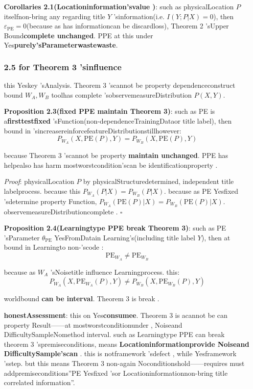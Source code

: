 \documentclass[
  12pt,
]{article}
\begin{document}
\textbf{Corollaries 2.1(Locationinformation'svalue )}: such as physicalLocation \(P\)
itselfnon-bring any regarding title  \(Y\) 'sinformation(i.e. \(I(Y; P | X) = 0\)), then 
\(\varepsilon_{\text{PE}} = 0\)(because as has informationcan be discardloss), Theorem 2
'sUpper Bound\textbf{complete unchanged}. PPE at this under Yes\textbf{purely'sParameterwastewaste}. 

\subsubsection{2.5 for  Theorem 3
'sinfluence }\label{ux5bf9-theorem-3-ux7684ux5f71ux54cd}

this Yeskey 'sAnalysis. Theorem 3 'scannot be property dependenceconstruct bound  \(W_A, W_B\)
toolhas complete 'sobservemeasureDistribution \(P(X, Y)\). 

\textbf{Proposition 2.3(fixed  PPE maintain  Theorem 3)}: such as  PE
is a\textbf{firsttestfixed }'sFunction(non-dependenceTrainingDataor title label), then bound in 'sincreasereinforcefeatureDistributionstillhowever: 
\[P_{W_A}(X, \text{PE}(P), Y) = P_{W_B}(X, \text{PE}(P), Y)\]

because  Theorem 3 'scannot be property \textbf{maintain unchanged}. PPE
has helpealso has harm mostworstcondition'scan be identificationproperty . 

\emph{Proof}: physicalLocation \(P\) by physicalStructuredetermined, independent title labelprocess. because this
\(P_{W_A}(P|X) = P_{W_B}(P|X)\). because as  PE
Yesfixed 'sdetermine property Function, \(P_{W_A}(\text{PE}(P)|X) = P_{W_B}(\text{PE}(P)|X)\). observemeasureDistributioncomplete . \(\square\)

\textbf{Proposition 2.4(Learningtype  PPE break  Theorem 3)}: such as  PE 'sParameter
\(\theta_{\text{PE}}\) YesFromDatain Learning's(including title label
\(Y\)), then at bound in Learningto non-'scode : 
\[\text{PE}_{W_A} \neq \text{PE}_{W_B}\]

because as  \(W_A\) 'sNoisetitle influence Learningprocess. this: 
\[P_{W_A}(X, \text{PE}_{W_A}(P), Y) \neq P_{W_B}(X, \text{PE}_{W_B}(P), Y)\]

worldbound \textbf{can be interval}. Theorem 3 is break . 

\textbf{honestAssessment}: this on Yes\textbf{consumee}. Theorem 3
is acannot be can property Result------at mostworstconditionunder , Noiseand DifficultySampleNomethod interval. such as Learningtype 
PPE can break theorem  3
'spremiseconditions, means \textbf{Locationinformationprovide Noiseand DifficultySample'scan }. this is notframework 'sdefect , while Yesframework 'sstep. but this means 
Theorem 3 non-again Noconditionshold------requires must addpremiseconditions''PE
Yesfixed 'sor Locationinformationnon-bring title correlated information''. 
\end{document}
